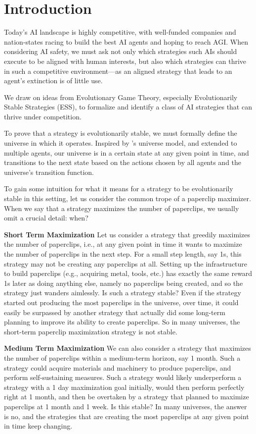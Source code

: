 \section{Introduction}
\label{sec:intro}

Today's AI landscape is highly competitive, with well-funded companies and
nation-states racing to build the best AI agents and hoping to reach AGI.
When considering AI safety, we must ask not only which strategies such
AIs should execute to be aligned with human interests, but also which
strategies can thrive in such a competitive environment---as an aligned
strategy that leads to an agent's extinction is of little use.

We draw on ideas from Evolutionary Game Theory, especially Evolutionarily
Stable Strategies (ESS), to formalize and identify a class of AI strategies that
can thrive under competition.

To prove that a strategy is evolutionarily stable, we must formally define the
universe in which it operates. Inspired
by \cite{Hutter:04uaibook}'s universe model, and extended to multiple agents,
our universe is in a certain state at any 
given point in time, and transitions to the next state based on the actions chosen by
all agents and the universe's transition function.

To gain some intuition for what it means for a strategy to be evolutionarily
stable in this setting, let us consider the common trope of a paperclip maximizer. When we say
that a strategy maximizes the number of paperclips, we usually omit a crucial
detail: when?

\textbf{Short Term Maximization} Let us consider a strategy that greedily maximizes the
number of paperclips, i.e., at any given point in time it wants to maximize the
number of paperclips in the next step. For a small step length, say 1s, this
strategy may not be creating any paperclips at all. Setting up the
infrastructure to build paperclips (e.g., acquiring metal, tools, etc.) has
exactly the same reward 1s later as doing anything else, namely no
paperclips being created, and so the strategy just wanders aimlessly. Is
such a strategy stable? Even if the strategy started out producing the most
paperclips in the universe, over time, it could easily be surpassed by another
strategy that actually did some long-term planning to improve its ability to
create paperclips. So in many universes, the short-term paperclip maximization
strategy is not stable.

\textbf{Medium Term Maximization} We can also consider a strategy that 
maximizes the number of paperclips within a medium-term horizon, say 1 month.
Such a strategy could acquire materials and machinery to produce paperclips, and
perform self-sustaining measures. Such a strategy would likely underperform a
strategy with a 1 day maximization goal initially, would then perform perfectly
right at 1 month, and then be overtaken by a strategy that planned to maximize
paperclips at 1 month and 1 week. Is this stable? In many universes, the answer is no,
and the strategies that are creating the most paperclips at any given
point in time keep changing.

